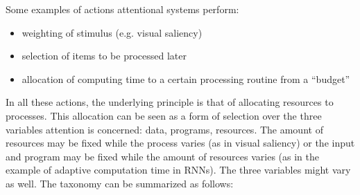 \documentclass[12pt]{article}
\begin{document}
Some examples of actions attentional systems perform:
\begin{itemize}
    \item weighting of stimulus (e.g. visual saliency)
    \item selection of items to be processed later
    \item allocation of computing time to a certain processing routine from a “budget”
\end{itemize}

In all these actions, the underlying principle is that of allocating resources to processes.
This allocation can be seen as a form of selection over the three variables attention is concerned: data, programs, resources.
The amount of resources may be fixed while the process varies (as in visual saliency) or the input and program may be fixed
while the amount of resources varies (as in the example of adaptive computation time in RNNs).
The three variables might vary as well.
The taxonomy can be summarized as follows:
\end{document}
